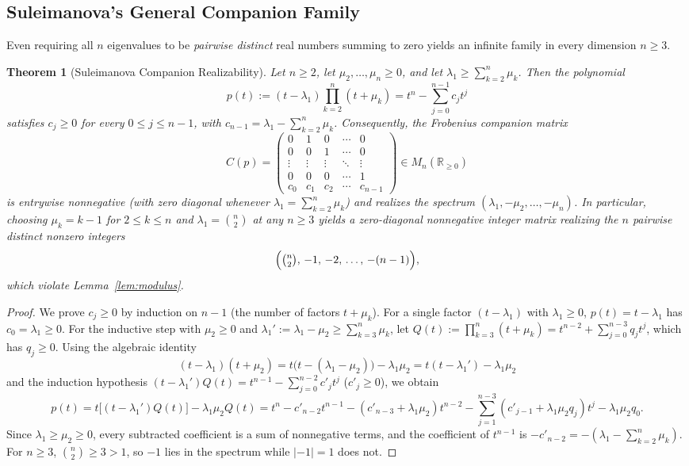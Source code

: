 \documentclass[11pt]{article}
\newtheorem{theorem}{Theorem}[section]
\theoremstyle{definition}
\theoremstyle{remark}
\begin{document}
\subsection{Suleimanova's General Companion Family}

Even requiring all $n$ eigenvalues to be \emph{pairwise distinct} real numbers summing to
zero yields an infinite family in every dimension $n \ge 3$.

\begin{theorem}[Suleimanova Companion Realizability]\label{thm:suleimanova}
Let $n \ge 2$, let $\mu_2, \dots, \mu_n \ge 0$, and let $\lambda_1 \ge \sum_{k=2}^n \mu_k$.
Then the polynomial
\[
  p(t) := (t - \lambda_1)\prod_{k=2}^n (t + \mu_k)
  = t^n - \sum_{j=0}^{n-1} c_j t^j
\]
satisfies $c_j \ge 0$ for every $0 \le j \le n - 1$, with $c_{n-1} = \lambda_1 -
\sum_{k=2}^n \mu_k$. Consequently, the Frobenius companion matrix
\[
  C(p) = \begin{pmatrix}
    0 & 1 & 0 & \cdots & 0 \\
    0 & 0 & 1 & \cdots & 0 \\
    \vdots & \vdots & \vdots & \ddots & \vdots \\
    0 & 0 & 0 & \cdots & 1 \\
    c_0 & c_1 & c_2 & \cdots & c_{n-1}
  \end{pmatrix} \in M_n(\mathbb{R}_{\ge 0})
\]
is entrywise nonnegative (with zero diagonal whenever $\lambda_1 = \sum_{k=2}^n \mu_k$)
and realizes the spectrum $(\lambda_1, -\mu_2, \dots, -\mu_n)$. In particular, choosing
$\mu_k = k - 1$ for $2 \le k \le n$ and $\lambda_1 = \binom{n}{2}$ at any $n \ge 3$
yields a zero-diagonal nonnegative integer matrix realizing the $n$ pairwise distinct
nonzero integers
\[
  \Bigl(\tbinom{n}{2}, \, -1, \, -2, \, \dots, \, -(n - 1)\Bigr),
\]
which violate Lemma~\ref{lem:modulus}.
\end{theorem}

\begin{proof}
We prove $c_j \ge 0$ by induction on $n - 1$ (the number of factors $t + \mu_k$). For a
single factor $(t - \lambda_1)$ with $\lambda_1 \ge 0$, $p(t) = t - \lambda_1$ has $c_0 =
\lambda_1 \ge 0$. For the inductive step with $\mu_2 \ge 0$ and $\lambda_1' := \lambda_1 -
\mu_2 \ge \sum_{k=3}^n \mu_k$, let $Q(t) := \prod_{k=3}^n (t + \mu_k) = t^{n-2} +
\sum_{j=0}^{n-3} q_j t^j$, which has $q_j \ge 0$. Using the algebraic identity
\[
  (t - \lambda_1)(t + \mu_2) = t\bigl(t - (\lambda_1 - \mu_2)\bigr) - \lambda_1 \mu_2
  = t(t - \lambda_1') - \lambda_1 \mu_2
\]
and the induction hypothesis $(t - \lambda_1')Q(t) = t^{n-1} - \sum_{j=0}^{n-2} c'_j t^j$
($c'_j \ge 0$), we obtain
\[
  p(t) = t\bigl[(t - \lambda_1')Q(t)\bigr] - \lambda_1 \mu_2 Q(t)
  = t^n - c'_{n-2} t^{n-1} - (c'_{n-3} + \lambda_1 \mu_2)t^{n-2}
    - \sum_{j=1}^{n-3} (c'_{j-1} + \lambda_1 \mu_2 q_j)t^j - \lambda_1 \mu_2 q_0.
\]
Since $\lambda_1 \ge \mu_2 \ge 0$, every subtracted coefficient is a sum of nonnegative
terms, and the coefficient of $t^{n-1}$ is $-c'_{n-2} = -(\lambda_1 - \sum_{k=2}^n \mu_k)$.
For $n \ge 3$, $\binom{n}{2} \ge 3 > 1$, so $-1$ lies in the spectrum while $|-1| = 1$
does not.
\end{proof}
\end{document}
